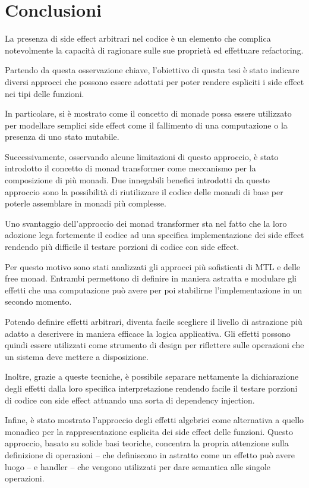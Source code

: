 \chapter{Conclusioni}

La presenza di side effect arbitrari nel codice è un elemento che complica notevolmente la capacità di ragionare sulle sue proprietà ed effettuare refactoring.

Partendo da questa osservazione chiave, l'obiettivo di questa tesi è stato indicare diversi approcci che possono essere adottati per poter rendere espliciti i side effect nei tipi delle funzioni.

In particolare, si è mostrato come il concetto di monade possa essere utilizzato per modellare semplici side effect come il fallimento di una computazione o la presenza di uno stato mutabile.

Successivamente, osservando alcune limitazioni di questo approccio, è stato introdotto il concetto di monad transformer come meccanismo per la composizione di più monadi.
Due innegabili benefici introdotti da questo approccio sono la possibilità di riutilizzare il codice delle monadi di base per poterle assemblare in monadi più complesse.

Uno svantaggio dell'approccio dei monad transformer sta nel fatto che la loro adozione lega fortemente il codice ad una specifica implementazione dei side effect rendendo più difficile il testare porzioni di codice con side effect.

Per questo motivo sono stati analizzati gli approcci più sofisticati di MTL e delle free monad.
Entrambi permettono di definire in maniera astratta e modulare gli effetti che una computazione può avere per poi stabilirne l'implementazione in un secondo momento.

Potendo definire effetti arbitrari, diventa facile scegliere il livello di astrazione più adatto a descrivere in maniera efficace la logica applicativa.
Gli effetti possono quindi essere utilizzati come strumento di design per riflettere sulle operazioni che un sistema deve mettere a disposizione.

Inoltre, grazie a queste tecniche, è possibile separare nettamente la dichiarazione degli effetti dalla loro specifica interpretazione rendendo facile il testare porzioni di codice con side effect attuando una sorta di dependency injection.

Infine, è stato mostrato l'approccio degli effetti algebrici come alternativa a quello monadico per la rappresentazione esplicita dei side effect delle funzioni.
Questo approccio, basato su solide basi teoriche, concentra la propria attenzione sulla definizione di operazioni -- che definiscono in astratto come un effetto può avere luogo -- e handler -- che vengono utilizzati per dare semantica alle singole operazioni.

